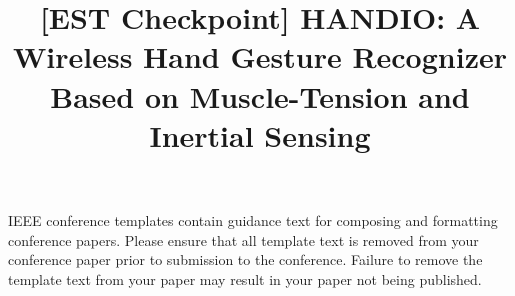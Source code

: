 \documentclass[conference]{IEEEtran}
\begin{document}
\title{[EST Checkpoint] HANDIO: A Wireless Hand
Gesture Recognizer Based on Muscle-Tension and
Inertial Sensing}

\maketitle










\vspace{12pt}
\color{red}
IEEE conference templates contain guidance text for composing and formatting conference papers. Please ensure that all template text is removed from your conference paper prior to submission to the conference. Failure to remove the template text from your paper may result in your paper not being published.
\end{document}
